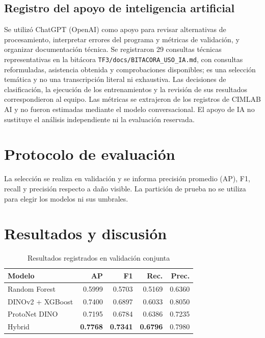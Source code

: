 \documentclass[conference]{IEEEtran}
\begin{document}
\subsection{Registro del apoyo de inteligencia artificial}
Se utilizó ChatGPT (OpenAI) como apoyo para revisar alternativas de procesamiento, interpretar errores del programa y métricas de validación, y organizar documentación técnica. Se registraron 29 consultas técnicas representativas en la bitácora \texttt{TF3/docs/BITACORA\_USO\_IA.md}, con consultas reformuladas, asistencia obtenida y comprobaciones disponibles; es una selección temática y no una transcripción literal ni exhaustiva. Las decisiones de clasificación, la ejecución de los entrenamientos y la revisión de sus resultados correspondieron al equipo. Las métricas se extrajeron de los registros de CIMLAB AI y no fueron estimadas mediante el modelo conversacional. El apoyo de IA no sustituye el análisis independiente ni la evaluación reservada.

\section{Protocolo de evaluación}
La selección se realiza en validación y se informa precisión promedio (AP), F1, recall y precisión respecto a daño visible. La partición de prueba no se utiliza para elegir los modelos ni sus umbrales.
\section{Resultados y discusión}
\begin{table}[t]
\centering
\caption{Resultados registrados en validación conjunta}
\label{tab:metricas}
\begin{tabular}{lrrrr}
\toprule
Modelo & AP & F1 & Rec. & Prec. \\
\midrule
Random Forest & 0.5999 & 0.5703 & 0.5169 & 0.6360 \\
DINOv2 + XGBoost & 0.7400 & 0.6897 & 0.6033 & 0.8050 \\
ProtoNet DINO & 0.7195 & 0.6784 & 0.6386 & 0.7235 \\
Hybrid & \textbf{0.7768} & \textbf{0.7341} & \textbf{0.6796} & 0.7980 \\
\bottomrule
\end{tabular}
\end{table}
\end{document}
